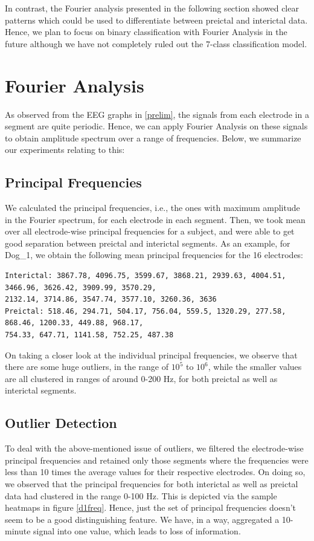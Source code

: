 \documentclass[a4paper]{article}
\begin{document}
In contrast, the Fourier analysis presented in the following section showed clear patterns which could be used to differentiate between preictal and interictal data. Hence, we plan to focus on binary classification with Fourier Analysis in the future although we have not completely ruled out the 7-class classification model.

\section{Fourier Analysis}
As observed from the EEG graphs in \ref{prelim}, the signals from each electrode in a segment are quite periodic. Hence, we can apply Fourier Analysis on these signals to obtain amplitude spectrum over a range of frequencies. Below, we summarize our experiments relating to this: 

\subsection{Principal Frequencies}
We calculated the principal frequencies, i.e., the ones with maximum amplitude in the Fourier spectrum, for each electrode in each segment. Then, we took mean over all electrode-wise principal frequencies for a subject, and were able to get good separation between preictal and interictal segments. As an example, for Dog\_1, we obtain the following mean principal frequencies for the 16 electrodes:
\begin{verbatim}
Interictal: 3867.78, 4096.75, 3599.67, 3868.21, 2939.63, 4004.51,  3466.96, 3626.42, 3909.99, 3570.29,
2132.14, 3714.86, 3547.74, 3577.10, 3260.36, 3636
Preictal: 518.46, 294.71, 504.17, 756.04, 559.5, 1320.29, 277.58,  868.46, 1200.33, 449.88, 968.17, 
754.33, 647.71, 1141.58, 752.25, 487.38
\end{verbatim} 
On taking a closer look at the individual principal frequencies, we observe that there are some huge outliers, in the range of $10^{5}$ to $10^{6}$, while the smaller values are all clustered in ranges of around 0-200 Hz, for both preictal as well as interictal segments. 

\subsection{Outlier Detection}
To deal with the above-mentioned issue of outliers, we filtered the electrode-wise principal frequencies and retained only those segments where the frequencies were less than 10 times the average values for their respective electrodes. On doing so, we observed that the principal frequencies for both interictal as well as preictal data had clustered in the range 0-100 Hz. This is depicted via the sample heatmaps in figure \ref{d1freq}. Hence, just the set of principal frequencies doesn't seem to be a good distinguishing feature. We have, in a way, aggregated a 10-minute signal into one value, which leads to loss of information.
\end{document}
